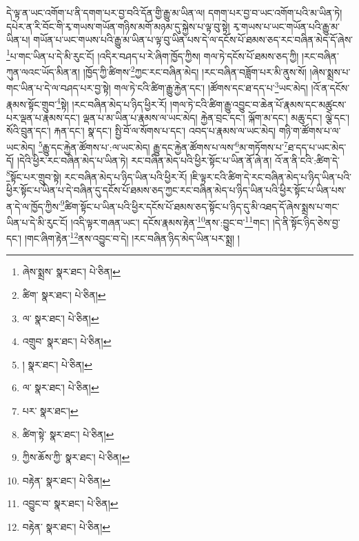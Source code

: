 དེ་ལྟ་ན་ཡང་འགོག་པ་ནི་དགག་པར་བྱ་བའི་དོན་གྱི་རྒྱུ་མ་ཡིན་ལ། དགག་པར་བྱ་བ་ཡང་འགོག་པའི་མ་ཡིན་ཏེ། དཔེར་ན་རི་བོང་གི་རྭ་གཡས་གཡོན་གཉིས་མགོ་མཉམ་དུ་སྐྱེས་པ་ལྟ་བུ་སྟེ། རྭ་གཡས་པ་ཡང་གཡོན་པའི་རྒྱུ་མ་ཡིན་པ། གཡོན་པ་ཡང་གཡས་པའི་རྒྱུ་མ་ཡིན་པ་ལྟ་བུ་ཡིན་པས་དེ་ལ་དངོས་པོ་ཐམས་ཅད་རང་བཞིན་མེད་དོ་ཞེས་\footnote{ཞེས་སྨྲས་  སྣར་ཐང་།  པེ་ཅིན། }པ་གང་ཡིན་པ་དེ་མི་རུང་ངོ། །འདིར་བཤད་པ་རེ་ཞིག་ཁྱོད་ཀྱིས། གལ་ཏེ་དངོས་པོ་ཐམས་ཅད་ཀྱི། །རང་བཞིན་ཀུན་ལའང་ཡོད་མིན་ན། །ཁྱོད་ཀྱི་ཚིགས་\footnote{ཚིག་  སྣར་ཐང་།  པེ་ཅིན། }ཀྱང་རང་བཞིན་མེད། །རང་བཞིན་བཟློག་པར་མི་ནུས་སོ། །ཞེས་སྨྲས་པ་གང་ཡིན་པ་དེ་ལ་བཤད་པར་བྱ་སྟེ། གལ་ཏེ་ངའི་ཚིག་རྒྱུ་རྐྱེན་དང་། །ཚོགས་དང་ཐ་དད་པ་\footnote{ལ་  སྣར་ཐང་།  པེ་ཅིན། }ཡང་མེད། །འོ་ན་དངོས་རྣམས་སྟོང་གྲུབ་\footnote{འགྲུབ་  སྣར་ཐང་།  པེ་ཅིན། }སྟེ། །རང་བཞིན་མེད་པ་ཉིད་ཕྱིར་རོ། །གལ་ཏེ་ངའི་ཚིག་རྒྱུ་འབྱུང་བ་ཆེན་པོ་རྣམས་དང་མཚུངས་པར་ལྡན་པ་རྣམས་དང་། ལྡན་པ་མ་ཡིན་པ་རྣམས་ལ་ཡང་མེད། རྐྱེན་བྲང་དང་། ལྐོག་མ་དང་། མཆུ་དང་། ལྕེ་དང་། སོའི་བྲུན་དང་། རྐན་དང་། སྣ་དང་། སྤྱི་བོ་ལ་སོགས་པ་དང་། འབད་པ་རྣམས་ལ་ཡང་མེད། གཉི་ག་ཚོགས་པ་ལ་ཡང་མེད། \footnote{།    སྣར་ཐང་།  པེ་ཅིན། }རྒྱུ་དང་རྐྱེན་ཚོགས་པ་:ལ་ཡང་མེད། རྒྱུ་དང་རྐྱེན་ཚོགས་པ་ལས་\footnote{ལ་  སྣར་ཐང་།  པེ་ཅིན། }མ་གཏོགས་པ་\footnote{པར་  སྣར་ཐང་། }ཐ་དད་པ་ཡང་མེད་དོ། །དེའི་ཕྱིར་རང་བཞིན་མེད་པ་ཡིན་ཏེ། རང་བཞིན་མེད་པའི་ཕྱིར་སྟོང་པ་ཡིན་ནོ་ཞེ་ན། འོ་ན་ནི་ངའི་:ཚིག་དེ་\footnote{ཚིག་སྟེ་  སྣར་ཐང་།  པེ་ཅིན། }སྟོང་པར་གྲུབ་སྟེ། རང་བཞིན་མེད་པ་ཉིད་ཡིན་པའི་ཕྱིར་རོ། །ཇི་ལྟར་ངའི་ཚིག་དེ་རང་བཞིན་མེད་པ་ཉིད་ཡིན་པའི་ཕྱིར་སྟོང་པ་ཡིན་པ་དེ་བཞིན་དུ་དངོས་པོ་ཐམས་ཅད་ཀྱང་རང་བཞིན་མེད་པ་ཉིད་ཡིན་པའི་ཕྱིར་སྟོང་པ་ཡིན་པས་ན་དེ་ལ་ཁྱོད་ཀྱིས་\footnote{ཀྱིས་ཆོས་ཀྱི་  སྣར་ཐང་།  པེ་ཅིན། }ཚིག་སྟོང་པ་ཡིན་པའི་ཕྱིར་དངོས་པོ་ཐམས་ཅད་སྟོང་པ་ཉིད་དུ་མི་འཐད་དོ་ཞེས་སྨྲས་པ་གང་ཡིན་པ་དེ་མི་རུང་ངོ། །འདི་ལྟར་གཞན་ཡང་། དངོས་རྣམས་རྟེན་\footnote{བརྟེན་  སྣར་ཐང་།  པེ་ཅིན། }ནས་:བྱུང་བ་\footnote{འབྱུང་བ་  སྣར་ཐང་།  པེ་ཅིན། }གང་། །དེ་ནི་སྟོང་ཉིད་ཅེས་བྱ་དང་། །གང་ཞིག་རྟེན་\footnote{བརྟེན་  སྣར་ཐང་།  པེ་ཅིན། }ནས་འབྱུང་བ་དེ། །རང་བཞིན་ཉིད་མེད་ཡིན་པར་སྨྲ། །

